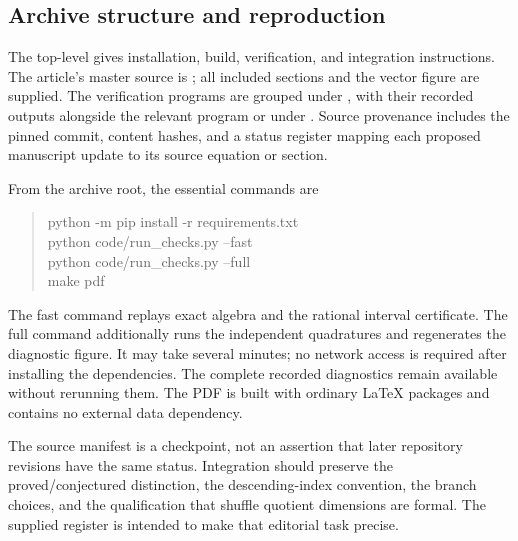 \subsection{Archive structure and reproduction}

The top-level  gives installation, build, verification,
and integration instructions. The article's master source is
; all included
sections and the vector figure are supplied. The verification programs
are grouped under , with their recorded outputs alongside
the relevant program or under . Source provenance includes
the pinned commit, content hashes, and a status register mapping each
proposed manuscript update to its source equation or section.

From the archive root, the essential commands are
\begin{quote}\small\ttfamily
python -m pip install -r requirements.txt\\
python code/run\_checks.py --fast\\
python code/run\_checks.py --full\\
make pdf
\end{quote}
The fast command replays exact algebra and the rational interval
certificate. The full command additionally runs the independent
quadratures and regenerates the diagnostic figure. It may take several
minutes; no network access is required after installing the dependencies.
The complete recorded diagnostics remain available without rerunning
them. The PDF is built with ordinary \LaTeX{} packages and contains
no external data dependency.

The source manifest is a checkpoint, not an assertion that later
repository revisions have the same status. Integration should preserve
the proved/conjectured distinction, the descending-index convention,
the branch choices, and the qualification that shuffle quotient
dimensions are formal. The supplied register is intended to make
that editorial task precise.
